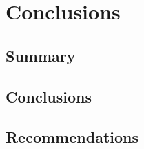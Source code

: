 
\chapter{Conclusions}
\label{ch:conclusions}

\ifpdf
    \graphicspath{{Chapter8/Figs/Raster/}{Chapter8/Figs/PDF/}{Chapter8/Figs/}}
\else
    \graphicspath{{Chapter8/Figs/Vector/}{Chapter8/Figs/}}
\fi


\section{Summary}
\label{sec:concl-summary}



\section{Conclusions}
\label{sec:concl-conclusions}



\section{Recommendations}
\label{sec:recommendations}

